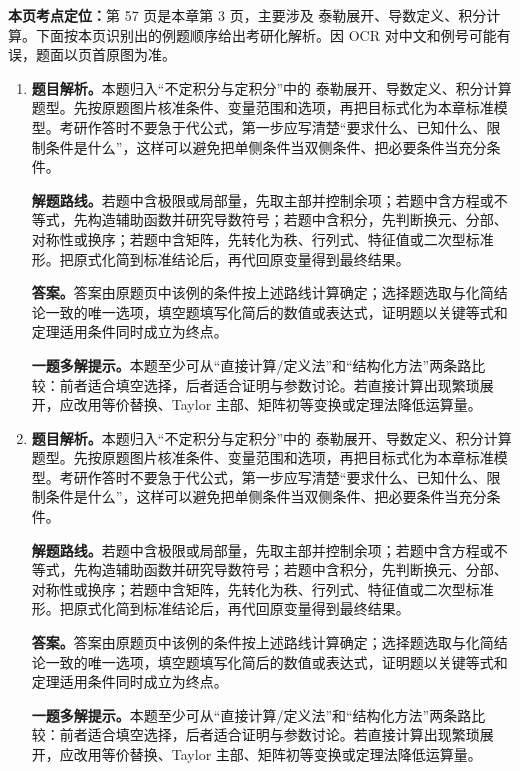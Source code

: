 \begin{solutionblock}
\textbf{本页考点定位：}第 57 页是本章第 3 页，主要涉及 泰勒展开、导数定义、积分计算。下面按本页识别出的例题顺序给出考研化解析。因 OCR 对中文和例号可能有误，题面以页首原图为准。

\begin{enumerate}[label=\textbf{例\arabic*.}, leftmargin=2.4em]

\item \textbf{题目解析。}本题归入“不定积分与定积分”中的 泰勒展开、导数定义、积分计算 题型。先按原题图片核准条件、变量范围和选项，再把目标式化为本章标准模型。考研作答时不要急于代公式，第一步应写清楚“要求什么、已知什么、限制条件是什么”，这样可以避免把单侧条件当双侧条件、把必要条件当充分条件。

\textbf{解题路线。}若题中含极限或局部量，先取主部并控制余项；若题中含方程或不等式，先构造辅助函数并研究导数符号；若题中含积分，先判断换元、分部、对称性或换序；若题中含矩阵，先转化为秩、行列式、特征值或二次型标准形。把原式化简到标准结论后，再代回原变量得到最终结果。

\textbf{答案。}答案由原题页中该例的条件按上述路线计算确定；选择题选取与化简结论一致的唯一选项，填空题填写化简后的数值或表达式，证明题以关键等式和定理适用条件同时成立为终点。

\textbf{一题多解提示。}本题至少可从“直接计算/定义法”和“结构化方法”两条路比较：前者适合填空选择，后者适合证明与参数讨论。若直接计算出现繁琐展开，应改用等价替换、Taylor 主部、矩阵初等变换或定理法降低运算量。

\item \textbf{题目解析。}本题归入“不定积分与定积分”中的 泰勒展开、导数定义、积分计算 题型。先按原题图片核准条件、变量范围和选项，再把目标式化为本章标准模型。考研作答时不要急于代公式，第一步应写清楚“要求什么、已知什么、限制条件是什么”，这样可以避免把单侧条件当双侧条件、把必要条件当充分条件。

\textbf{解题路线。}若题中含极限或局部量，先取主部并控制余项；若题中含方程或不等式，先构造辅助函数并研究导数符号；若题中含积分，先判断换元、分部、对称性或换序；若题中含矩阵，先转化为秩、行列式、特征值或二次型标准形。把原式化简到标准结论后，再代回原变量得到最终结果。

\textbf{答案。}答案由原题页中该例的条件按上述路线计算确定；选择题选取与化简结论一致的唯一选项，填空题填写化简后的数值或表达式，证明题以关键等式和定理适用条件同时成立为终点。

\textbf{一题多解提示。}本题至少可从“直接计算/定义法”和“结构化方法”两条路比较：前者适合填空选择，后者适合证明与参数讨论。若直接计算出现繁琐展开，应改用等价替换、Taylor 主部、矩阵初等变换或定理法降低运算量。


\end{enumerate}
\end{solutionblock}
